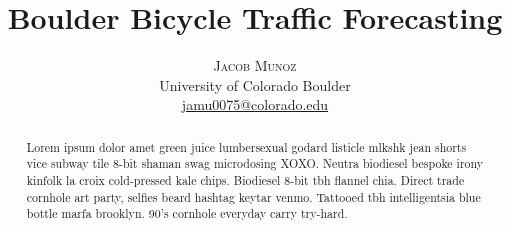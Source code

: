 \documentclass[twoside]{article}
\title{\vspace{-15mm}\fontsize{24pt}{10pt}\selectfont\textbf{Boulder Bicycle Traffic Forecasting}} %
\author{
\large
\textsc{Jacob Munoz} \\%
\normalsize University of Colorado Boulder \\ %
\normalsize \href{mailto:jamu0075@colorado.edu}{jamu0075@colorado.edu} %
\vspace{-5mm}
}
\date{}
\begin{document}
\maketitle %

\thispagestyle{fancy} %


\begin{abstract}

\noindent Lorem ipsum dolor amet green juice lumbersexual godard listicle mlkshk jean shorts vice subway tile 8-bit shaman swag microdosing XOXO. Neutra biodiesel bespoke irony kinfolk la croix cold-pressed kale chips. Biodiesel 8-bit tbh flannel chia. Direct trade cornhole art party, selfies beard hashtag keytar venmo. Tattooed tbh intelligentsia blue bottle marfa brooklyn. 90's cornhole everyday carry try-hard.

\end{abstract}

\end{document}
